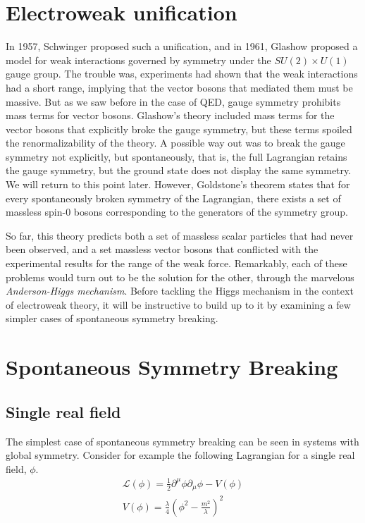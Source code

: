 \section{Electroweak unification}

In 1957, Schwinger proposed such a unification, and in 1961, Glashow proposed a model for weak interactions governed by symmetry under the $SU(2)\times U(1)$ gauge group. The trouble was, experiments had shown that the weak interactions had a short range, implying that the vector bosons that mediated them must be massive. But as we saw before in the case of QED, gauge symmetry prohibits mass terms for vector bosons. Glashow's theory included mass terms for the vector bosons that explicitly broke the gauge symmetry, but these terms spoiled the renormalizability of the theory. A possible way out was to break the gauge symmetry not explicitly, but spontaneously, that is, the full Lagrangian retains the gauge symmetry, but the ground state does not display the same symmetry. We will return to this point later. However, Goldstone's theorem states that for every spontaneously broken symmetry of the Lagrangian, there exists a set of massless spin-0 bosons corresponding to the generators of the symmetry group.

So far, this theory predicts both a set of massless scalar particles that had never been observed, and a set massless vector bosons that conflicted with the experimental results for the range of the weak force. Remarkably, each of these problems would turn out to be the solution for the other, through the marvelous \emph{Anderson-Higgs mechanism}. Before tackling the Higgs mechanism in the context of electroweak theory, it will be instructive to build up to it by examining a few simpler cases of spontaneous symmetry breaking. 

\section{Spontaneous Symmetry Breaking}

\subsection{Single real field}

The simplest case of spontaneous symmetry breaking can be seen in systems with global symmetry. Consider for example the following Lagrangian for a single real field, $\phi$.
\begin{align}
\mathcal{L}(\phi) = \frac{1}{2}\partial^\mu\phi\partial_\mu\phi - V(\phi)\\
V(\phi) = \frac{\lambda}{4}\left(\phi^2 - \frac{m^2}{\lambda}\right)^2
\label{eq:single_real_field_potential}
\end{align}

